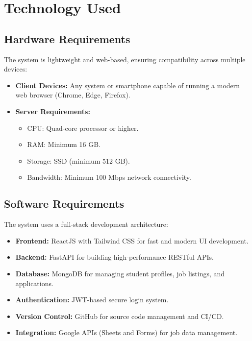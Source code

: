 \documentclass[14pt]{extarticle}
\begin{document}
\section{Technology Used}

\subsection{Hardware Requirements}
The system is lightweight and web-based, ensuring compatibility across multiple devices:
\begin{itemize}
  \item \textbf{Client Devices:} Any system or smartphone capable of running a modern web browser (Chrome, Edge, Firefox).
  \item \textbf{Server Requirements:} 
  \begin{itemize}
    \item CPU: Quad-core processor or higher.
    \item RAM: Minimum 16 GB.
    \item Storage: SSD (minimum 512 GB).
    \item Bandwidth: Minimum 100 Mbps network connectivity.
  \end{itemize}
\end{itemize}

\subsection{Software Requirements}
The system uses a full-stack development architecture:
\begin{itemize}
  \item \textbf{Frontend:} ReactJS with Tailwind CSS for fast and modern UI development.
  \item \textbf{Backend:} FastAPI for building high-performance RESTful APIs.
  \item \textbf{Database:} MongoDB for managing student profiles, job listings, and applications.
  \item \textbf{Authentication:} JWT-based secure login system.
  \item \textbf{Version Control:} GitHub for source code management and CI/CD.
  \item \textbf{Integration:} Google APIs (Sheets and Forms) for job data management.
\end{itemize}
\end{document}
